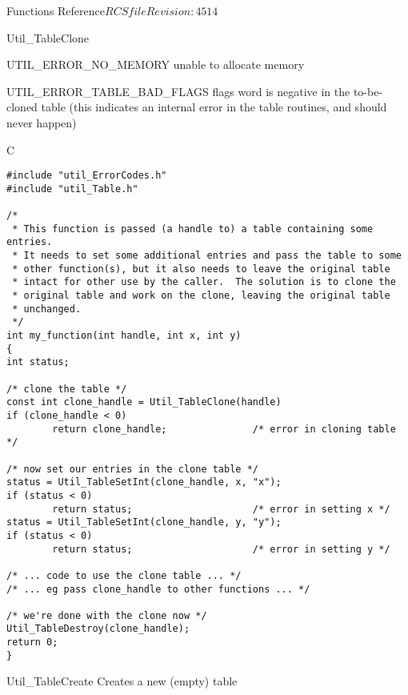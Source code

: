 \begin{cactuspart}{ Functions Reference}{$RCSfile$}{$Revision: 4514 $}
\begin{FunctionDescription}{Util\_TableClone}
\begin{ErrorSection}
\begin{Error}{UTIL\_ERROR\_NO\_MEMORY}
unable to allocate memory
\end{Error}
\begin{Error}{UTIL\_ERROR\_TABLE\_BAD\_FLAGS}
flags word is negative in the to-be-cloned table
(this indicates an internal error in the table routines,
and should never happen)
\end{Error}
\end{ErrorSection}

\begin{ExampleSection}
\begin{Example}{C}
\begin{verbatim}
#include "util_ErrorCodes.h"
#include "util_Table.h"

/*
 * This function is passed (a handle to) a table containing some entries.
 * It needs to set some additional entries and pass the table to some
 * other function(s), but it also needs to leave the original table
 * intact for other use by the caller.  The solution is to clone the
 * original table and work on the clone, leaving the original table
 * unchanged.
 */
int my_function(int handle, int x, int y)
{
int status;

/* clone the table */
const int clone_handle = Util_TableClone(handle)
if (clone_handle < 0)
        return clone_handle;               /* error in cloning table */

/* now set our entries in the clone table */
status = Util_TableSetInt(clone_handle, x, "x");
if (status < 0)
        return status;                     /* error in setting x */
status = Util_TableSetInt(clone_handle, y, "y");
if (status < 0)
        return status;                     /* error in setting y */

/* ... code to use the clone table ... */
/* ... eg pass clone_handle to other functions ... */

/* we're done with the clone now */
Util_TableDestroy(clone_handle);
return 0;
}
\end{verbatim}
\end{Example}
\end{ExampleSection}
\end{FunctionDescription}


\begin{FunctionDescription}{Util\_TableCreate}
\label{Util-TableCreate}
Creates a new (empty) table


\end{FunctionDescription}
\end{cactuspart}
